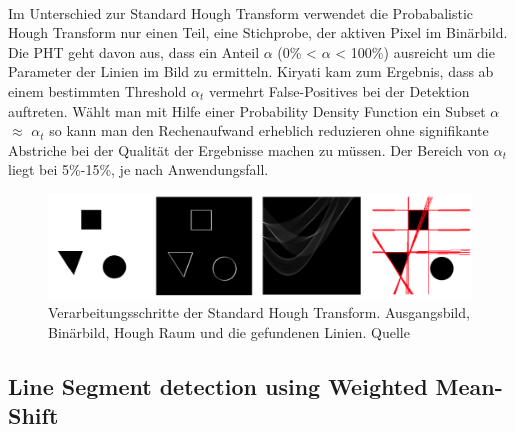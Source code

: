 \paragraph{}
Im Unterschied zur Standard Hough Transform verwendet die Probabalistic Hough Transform nur einen Teil, eine Stichprobe, der aktiven Pixel im Binärbild. Die PHT geht davon aus, dass ein Anteil $\alpha$ (0\% < $\alpha$ < 100\%) ausreicht um die Parameter der Linien im Bild zu ermitteln. Kiryati kam zum Ergebnis, dass ab einem bestimmten Threshold $\alpha_t$ vermehrt False-Positives bei der Detektion auftreten. Wählt man mit Hilfe einer Probability Density Function ein Subset $\alpha$ $\approx$ $\alpha_t$ so kann man den Rechenaufwand erheblich reduzieren ohne signifikante Abstriche bei der Qualität der Ergebnisse machen zu müssen. Der Bereich von $\alpha_t$ liegt bei 5\%-15\%, je nach Anwendungsfall.

\begin{figure}[!ht]
\centering
\includegraphics[scale=0.25]{images/hough-transform} 
\caption{Verarbeitungsschritte der Standard Hough Transform. Ausgangsbild, Binärbild, Hough Raum und die gefundenen Linien. Quelle \cite{kiryati}}
\label{fig:hough-transform}
\end{figure}

\pagebreak

\subsection{Line Segment detection using Weighted Mean-Shift}

